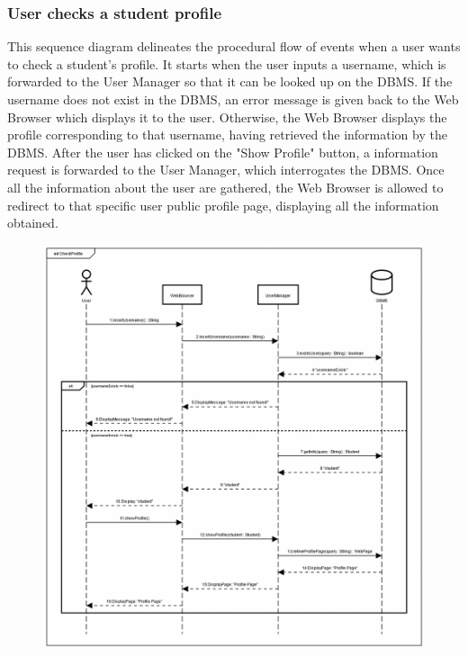 \documentclass[12pt,oneside,a4paper]{article}
\begin{document}
\clearpage

\subsubsection{User checks a student profile}
This sequence diagram delineates the procedural flow of events when a user wants to check a student's profile. It starts when the user inputs a username, which is forwarded to the User Manager so that it can be looked up on the DBMS. If the username does not exist in the DBMS, an error message is given back to the Web Browser which displays it to the user. Otherwise, the Web Browser displays the profile corresponding to that username, having retrieved the information by the DBMS. After the user has clicked on the "Show Profile" button, a information request is forwarded to the User Manager, which interrogates the DBMS. Once all the information about the user are gathered, the Web Browser is allowed to redirect to that specific user public profile page, displaying all the information obtained.
\begin{figure}[htbp]
    \centering
    \includegraphics[width=1\linewidth]{Images/Sequence Diagrams/CheckProfile.png}
    \label{fig:enter-label}
\end{figure}
\end{document}
